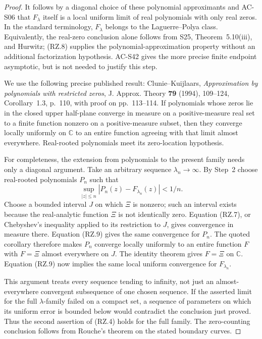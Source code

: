 \begin{proof}
It follows by a diagonal choice of these polynomial approximants and
AC-S06 that \(F_\lambda\) itself is a local uniform limit of real
polynomials with only real zeros.  In the standard terminology,
\(F_\lambda\) belongs to the Laguerre--Polya class.  Equivalently,
the real-zero conclusion alone follows from S25, Theorem~5.10(iii),
and Hurwitz; (RZ.8) supplies the polynomial-approximation property
without an additional factorization hypothesis.  AC-S42 gives the
more precise finite endpoint asymptotic, but is not needed to
justify this step.

We use the following precise published result: Clunie--Kuijlaars,
\emph{Approximation by polynomials with restricted zeros},
J. Approx. Theory \textbf{79} (1994), 109--124,
Corollary~1.3, p.~110, with proof on pp.~113--114.
If polynomials whose zeros lie in the closed upper half-plane
converge in measure on a positive-measure real set to a finite
function nonzero on a positive-measure subset, then they converge
locally uniformly on \(\mathbb C\) to an entire function agreeing
with that limit almost everywhere.  Real-rooted polynomials meet
its zero-location hypothesis.

For completeness, the extension from polynomials to the present
family needs only a diagonal argument.  Take an arbitrary sequence
\(\lambda_n\to\infty\).  By Step~2 choose real-rooted polynomials
\(P_n\) such that
\[
 \sup_{|z|\le n}|P_n(z)-F_{\lambda_n}(z)|<1/n.
 \tag{RZ.9}
\]
Choose a bounded interval \(J\) on which \(\Xi\) is nonzero;
such an interval exists because the real-analytic function \(\Xi\)
is not identically zero.  Equation (RZ.7), or Chebyshev's inequality
applied to its restriction to \(J\), gives convergence in measure
there.  Equation (RZ.9) gives the same convergence for \(P_n\).
The quoted corollary therefore makes \(P_n\) converge locally
uniformly to an entire function \(F\) with \(F=\Xi\) almost
everywhere on \(J\).  The identity theorem gives \(F=\Xi\) on
\(\mathbb C\).  Equation (RZ.9) now implies the same local uniform
convergence for \(F_{\lambda_n}\).

This argument treats every sequence tending to infinity, not just
an almost-everywhere convergent subsequence of one chosen sequence.
If the asserted limit for the full \(\lambda\)-family failed on a
compact set, a sequence of parameters on which its uniform error
is bounded below would contradict the conclusion just proved.
Thus the second assertion of (RZ.4) holds for the full family.
The zero-counting conclusion follows from Rouche's theorem on
the stated boundary curves.


\end{proof}
